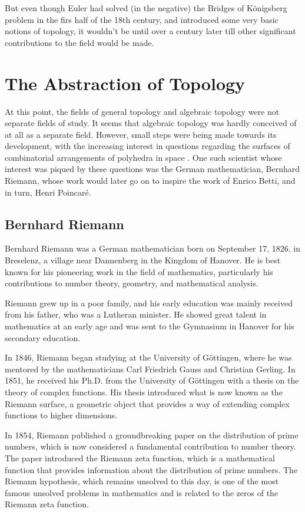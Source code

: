 \documentclass{IEEEcsmag}
\begin{document}
      But even though Euler had solved (in the negative) the Bridges of Königsberg problem in the firs half of 
      the 18th century, and introduced some very basic notions of topology, it wouldn't be until over a century 
      later till other significant contributions to the field would be made.

\section{The Abstraction of Topology}
  At this point, the fields of general topology and algebraic topology were not separate fields of study.
  It seems that algebraic topology was hardly conceived of at all as a separate field. However, small steps 
  were being made towards its development, with the increasing interest in questions regarding the surfaces of
  combinatorial arrangements of polyhedra in space \cite{carlson2007histTop}. One such scientist whose interest
  was piqued by these questions was the German mathematician, Bernhard Riemann, whose work would later go on
  to inspire the work of Enrico Betti, and in turn, Henri Poincaré.

  \subsection{Bernhard Riemann}
    Bernhard Riemann was a German mathematician born on September 17, 1826, in Breselenz, a village near Dannenberg in 
    the Kingdom of Hanover. He is best known for his pioneering work in the field of mathematics, particularly his 
    contributions to number theory, geometry, and mathematical analysis.

    Riemann grew up in a poor family, and his early education was mainly received from his father, who was a Lutheran 
    minister. He showed great talent in mathematics at an early age and was sent to the Gymnasium in Hanover for his 
    secondary education.

    In 1846, Riemann began studying at the University of Göttingen, where he was mentored by the mathematicians Carl 
    Friedrich Gauss and Christian Gerling. In 1851, he received his Ph.D. from the University of Göttingen with a 
    thesis on the theory of complex functions. His thesis introduced what is now known as the Riemann surface, a 
    geometric object that provides a way of extending complex functions to higher dimensions.

    In 1854, Riemann published a groundbreaking paper on the distribution of prime numbers, which is now considered a 
    fundamental contribution to number theory. The paper introduced the Riemann zeta function, which is a mathematical 
    function that provides information about the distribution of prime numbers. The Riemann hypothesis, which remains 
    unsolved to this day, is one of the most famous unsolved problems in mathematics and is related to the zeros of 
    the Riemann zeta function.
\end{document}
